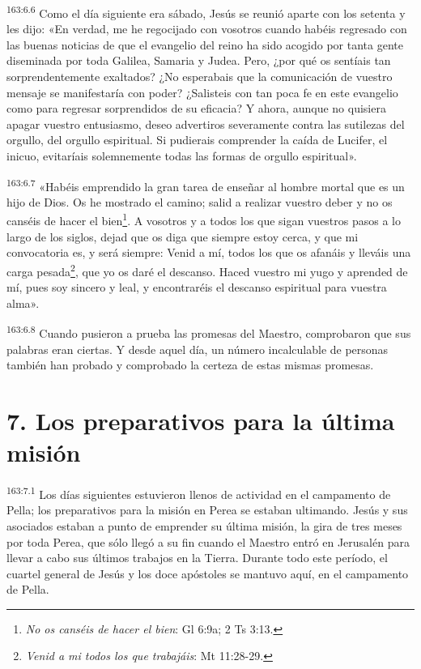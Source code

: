 \par
\textsuperscript{163:6.6} Como el día siguiente era sábado, Jesús se reunió aparte con los setenta y les dijo: «En verdad, me he regocijado con vosotros cuando habéis regresado con las buenas noticias de que el evangelio del reino ha sido acogido por tanta gente diseminada por toda Galilea, Samaria y Judea. Pero, ¿por qué os sentíais tan sorprendentemente exaltados? ¿No esperabais que la comunicación de vuestro mensaje se manifestaría con poder? ¿Salisteis con tan poca fe en este evangelio como para regresar sorprendidos de su eficacia? Y ahora, aunque no quisiera apagar vuestro entusiasmo, deseo advertiros severamente contra las sutilezas del orgullo, del orgullo espiritual. Si pudierais comprender la caída de Lucifer, el inicuo, evitaríais solemnemente todas las formas de orgullo espiritual».

\par
\textsuperscript{163:6.7} «Habéis emprendido la gran tarea de enseñar al hombre mortal que es un hijo de Dios. Os he mostrado el camino; salid a realizar vuestro deber y no os canséis de hacer el bien\footnote{\textit{No os canséis de hacer el bien}: Gl 6:9a; 2 Ts 3:13.}. A vosotros y a todos los que sigan vuestros pasos a lo largo de los siglos, dejad que os diga que siempre estoy cerca, y que mi convocatoria es, y será siempre: Venid a mí, todos los que os afanáis y lleváis una carga pesada\footnote{\textit{Venid a mi todos los que trabajáis}: Mt 11:28-29.}, que yo os daré el descanso. Haced vuestro mi yugo y aprended de mí, pues soy sincero y leal, y encontraréis el descanso espiritual para vuestra alma».

\par
\textsuperscript{163:6.8} Cuando pusieron a prueba las promesas del Maestro, comprobaron que sus palabras eran ciertas. Y desde aquel día, un número incalculable de personas también han probado y comprobado la certeza de estas mismas promesas.

\section*{7. Los preparativos para la última misión}
\par
\textsuperscript{163:7.1} Los días siguientes estuvieron llenos de actividad en el campamento de Pella; los preparativos para la misión en Perea se estaban ultimando. Jesús y sus asociados estaban a punto de emprender su última misión, la gira de tres meses por toda Perea, que sólo llegó a su fin cuando el Maestro entró en Jerusalén para llevar a cabo sus últimos trabajos en la Tierra. Durante todo este período, el cuartel general de Jesús y los doce apóstoles se mantuvo aquí, en el campamento de Pella.


